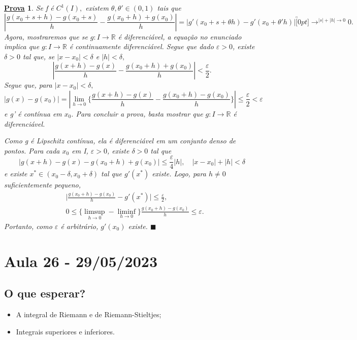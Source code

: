 \documentclass{article}
\newtheorem*{proof*}{\underline{Prova}}
\renewcommand\qedsymbol{$\blacksquare$}
\begin{document}
\begin{proof*}
  Se f é \(C^{1}(I),\) existem \(\theta , \theta '\in(0, 1)\) tais que 
    \[
      |\frac{g(x_{0}+s+h)-g(x_{0}+s)}{h}-\frac{g(x_{0}+h)+g(x_{0})}{h}| = |g'(x_{0}+s+\theta h)-g'(x_{0}+\theta 'h)|\overbracket[0pt]{\longrightarrow}^{|s|+|h|\to 0}0.
    \]
  Agora, mostraremos que se \(g:I\rightarrow \mathbb{R}\) é diferenciável, a equa\c cão
no enunciado implica que \(g:I\rightarrow \mathbb{R}\) é continuamente diferenciável. Segue que
dado \(\varepsilon >0\), existe \(\delta >0\) tal que, se \(|x-x_{0}| < \delta \) e \(|h| < \delta ,\) 
  \[
    |\frac{g(x+h)-g(x)}{h}-\frac{g(x_{0}+h)+g(x_{0})}{h}| < \frac{\varepsilon }{2}.
  \]
Segue que, para \(|x-x_{0}| < \delta ,\) 
  \[
    |g(x)-g(x_{0})| = |\lim_{h\to 0}\biggl\{\frac{g(x+h)-g(x)}{h}-\frac{g(x_{0}+h)-g(x_{0})}{h}\biggr\}|\leq \frac{\varepsilon }{2} < \varepsilon  
  \]
e g' é contínua em \(x_{0}.\) Para concluir a prova, basta mostrar que \(g:I\rightarrow \mathbb{R}\) é diferenciável.

Como g é Lipschitz contínua, ela é diferenciável em um conjunto denso de pontos.
Para cada \(x_{0}\) em I, \(\varepsilon >0\), existe \(\delta >0\) tal que 
  \[
    |g(x+h)-g(x)-g(x_{0}+h)+g(x_{0})|\leq \frac{\varepsilon }{4}|h|,\quad|x-x_{0}|+|h|<\delta 
  \]
  e existe \(x^{*}\in(x_{0}-\delta ,x_{0}+\delta )\) tal que \(g'(x^{*})\) existe.
  Logo, para \(h\neq0\) suficientemente pequeno,
 \begin{align*}
   &\biggl|\frac{g(x_{0}+h)-g(x_{0})}{h}-g'(x^{*})\biggr|\leq \frac{\varepsilon }{2},\\
   &0\leq \biggl\{\limsup_{h\to 0}-\liminf_{h\to 0}\biggr\}\frac{g(x_{0}+h)-g(x_{0})}{h}\leq \varepsilon .
 \end{align*}
 Portanto, como \(\varepsilon\) é arbitrário, \(g'(x_{0})\) existe. \qedsymbol
\end{proof*}
\newpage

\section{Aula 26 - 29/05/2023}
\subsection{O que esperar?}
\begin{itemize}
  \item A integral de Riemann e de Riemann-Stieltjes;
  \item Integrais superiores e inferiores.
\end{itemize}
\end{document}
